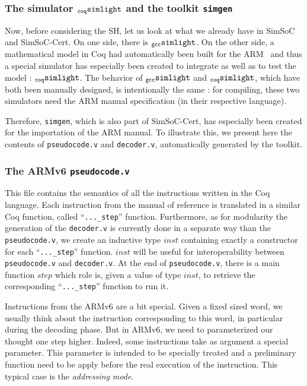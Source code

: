 \documentclass[a4paper, 11pt]{article}
\newcommand{\gccSL}{$_{\tt gcc}{\tt simlight}$\xspace}
\newcommand{\SL}{$_{\tt coq}{\tt simlight}$\xspace}
\newcommand{\simgen}{{\tt simgen}\xspace}
\newcommand{\simsoc}{SimSoC\xspace}
\newcommand{\SScert}{SimSoC-Cert\xspace}
\begin{document}
\subsubsection{The simulator \SL and the toolkit \simgen}
\label{s:simgendef}
Now, before considering the SH, let us look at what we already have in \simsoc and \SScert. On one side, there is \gccSL. On the other side, a mathematical model in Coq had automatically been built for the ARM~\cite{arm} and thus a special simulator has especially been created to integrate as well as to test the model : \SL.
The behavior of \gccSL and \SL, which have both been manually designed, is intentionally the same : for compiling, these two simulators need the ARM manual specification (in their respective language).

Therefore, \simgen, which is also part of \SScert, has especially been created for the importation of the ARM manual.
To illustrate this, we present here the contents of \verb|pseudocode.v| and \verb|decoder.v|, automatically generated by the toolkit.

\subsubsection{The ARMv6 {\tt pseudocode.v}}
\label{s:oldarm}
This file contains the semantics of all the instructions written in the Coq language. Each instruction from the manual of reference is translated in a similar Coq function, called ``\verb|..._step|'' function. 
Furthermore, as for modularity the generation of the {\tt decoder.v} is currently done in a separate way than the {\tt pseudocode.v}, we create an inductive type $inst$ containing exactly a constructor for each ``\verb|..._step|'' function. $inst$ will be useful for interoperability between {\tt pseudocode.v} and {\tt decoder.v}. At the end of {\tt pseudocode.v}, there is a main function $step$ which role is, given a value of type $inst$, to retrieve the corresponding ``\verb|..._step|'' function to run it.

Instructions from the ARMv6 are a bit special. Given a fixed sized word, we usually think about the instruction corresponding to this word, in particular during the decoding phase. But in ARMv6, we need to parameterized our thought one step higher. Indeed, some instructions take as argument a special parameter. This parameter is intended to be specially treated and a preliminary function need to be apply before the real execution of the instruction. This typical case is the \emph{addressing mode}.
\end{document}
